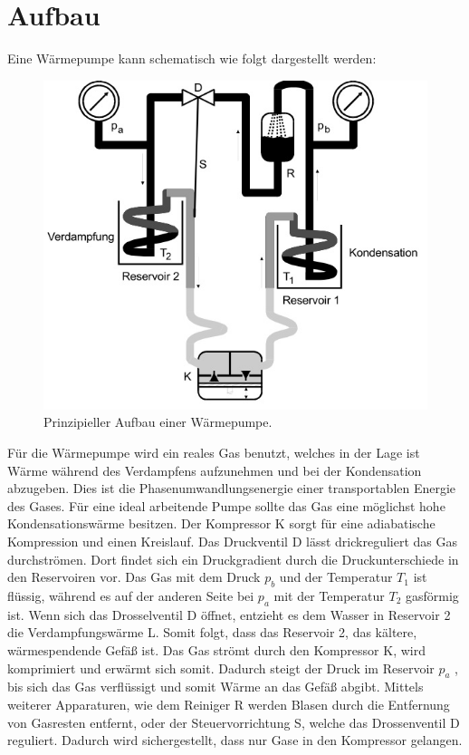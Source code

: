 \section{Aufbau}
\label{sec:Aufbau}
Eine Wärmepumpe kann schematisch wie folgt dargestellt werden:
\begin{figure}
  \centering
  \includegraphics{data/Abb1.jpg}
  \caption{Prinzipieller Aufbau einer Wärmepumpe. \cite{AnleitungV206}}
  \label{fig:Abb1}
\end{figure}
Für die Wärmepumpe wird ein reales Gas benutzt, welches in der Lage ist Wärme während des Verdampfens aufzunehmen und bei der Kondensation abzugeben.
Dies ist die Phasenumwandlungsenergie einer transportablen Energie des Gases.
Für eine ideal arbeitende Pumpe sollte das Gas eine möglichst hohe Kondensationswärme besitzen.
Der Kompressor K sorgt für eine adiabatische Kompression und einen Kreislauf.
Das Druckventil D lässt drickreguliert das Gas durchströmen.
Dort findet sich ein Druckgradient durch die Druckunterschiede in den Reservoiren vor.
Das Gas mit dem Druck $p_b$ und der Temperatur $T_1$ ist flüssig,
während es auf der anderen Seite bei $p_a$ mit der Temperatur $T_2$ gasförmig ist.
Wenn sich das Drosselventil D öffnet, entzieht es dem Wasser in Reservoir 2 die Verdampfungswärme L.
Somit folgt, dass das Reservoir 2, das kältere, wärmespendende Gefäß ist.
Das Gas strömt durch den Kompressor K, wird komprimiert und erwärmt sich somit.
Dadurch steigt der Druck im Reservoir $p_a$ , bis sich das Gas verflüssigt und somit Wärme an das Gefäß abgibt.
Mittels weiterer Apparaturen, wie dem Reiniger R werden Blasen durch die Entfernung von Gasresten entfernt,
oder der Steuervorrichtung S, welche das Drossenventil D reguliert.
Dadurch wird sichergestellt, dass nur Gase in den Kompressor gelangen.

